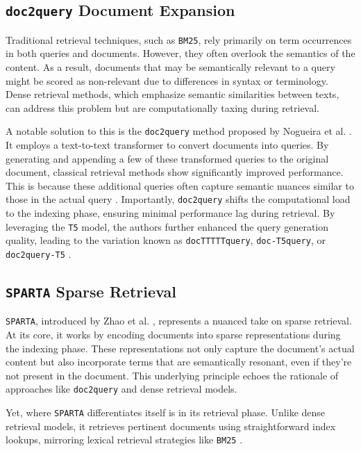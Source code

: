 \documentclass[sigconf]{acmart}
\begin{document}
\subsection*{\texttt{doc2query} Document Expansion}\label{sec:doc2query}
Traditional retrieval techniques, such as \texttt{BM25}, rely primarily on term occurrences in both queries and documents. However, they often overlook the semantics of the content. As a result, documents that may be semantically relevant to a query might be scored as non-relevant due to differences in syntax or terminology. Dense retrieval methods, which emphasize semantic similarities between texts, can address this problem but are computationally taxing during retrieval.

A notable solution to this is the \texttt{doc\-2query} method proposed by Nogueira et al. \cite{nogueira2019document}. It employs a text-to-text transformer to convert documents into queries. By generating and appending a few of these transformed queries to the original document, classical retrieval methods show significantly improved performance. This is because these additional queries often capture semantic nuances similar to those in the actual query \cite{nogueira2019document,nogueira2019doc2query,pradeep2021expando}. Importantly, \texttt{doc\-2query} shifts the computational load to the indexing phase, ensuring minimal performance lag during retrieval. By leveraging the \texttt{T5} model, the authors further enhanced the query generation quality, leading to the variation known as \texttt{doc\-TTTTTquery}, \texttt{doc\--T5query}, or \texttt{doc\-2query\--T5} \cite{nogueira2019doc2query}.

\subsection*{\texttt{SPARTA} Sparse Retrieval}\label{sec:sparta}
\texttt{SPARTA}, introduced by Zhao et al. \cite{zhao2020sparta}, represents a nuanced take on sparse retrieval. At its core, it works by encoding documents into sparse representations during the indexing phase. These representations not only capture the document's actual content but also incorporate terms that are semantically resonant, even if they're not present in the document. This underlying principle echoes the rationale of approaches like \texttt{doc2query} and dense retrieval models.

Yet, where \texttt{SPARTA} differentiates itself is in its retrieval phase. Unlike dense retrieval models, it retrieves pertinent documents using straightforward index lookups, mirroring lexical retrieval strategies like \texttt{BM25} \cite{zhao2020sparta}.
\end{document}
